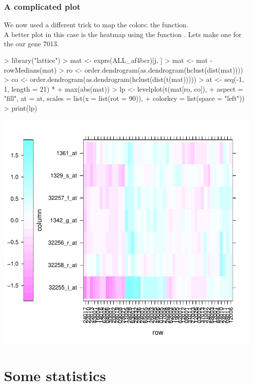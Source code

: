 \begin{frame}
  \frametitle{A complicated plot}
  We now used a different trick to map the colors: the  function. \\
  A better plot in this case is the heatmap using the  function . Lets make one for the our gene 7013.
\begin{Schunk}
\begin{Sinput}
> library("lattice")
> mat <- exprs(ALL_af4bcr)[j, ]
> mat <- mat - rowMedians(mat)
> ro <- order.dendrogram(as.dendrogram(hclust(dist(mat))))
> co <- order.dendrogram(as.dendrogram(hclust(dist(t(mat)))))
> at <- seq(-1, 1, length = 21) * 
+     max(abs(mat))
> lp <- levelplot(t(mat[ro, co]), 
+     aspect = "fill", at = at, scales = list(x = list(rot = 90)), 
+     colorkey = list(space = "left"))
> print(lp)
\end{Sinput}
\end{Schunk}
\includegraphics{plots/fig-022}
\end{frame}

\section{Some statistics}

